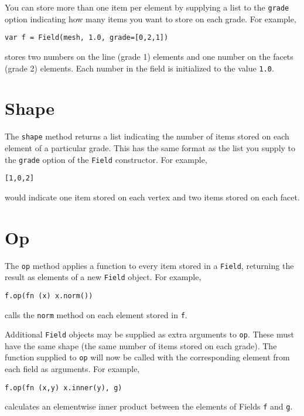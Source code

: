 You can store more than one item per element by supplying a list to the
\texttt{grade} option indicating how many items you want to store on
each grade. For example,

\begin{lstlisting}
var f = Field(mesh, 1.0, grade=[0,2,1])
\end{lstlisting}

stores two numbers on the line (grade 1) elements and one number on the
facets (grade 2) elements. Each number in the field is initialized to
the value \texttt{1.0}.

\hypertarget{shape}{%
\section{Shape}\label{shape}}

The \texttt{shape} method returns a list indicating the number of items
stored on each element of a particular grade. This has the same format
as the list you supply to the \texttt{grade} option of the
\texttt{Field} constructor. For example,

\begin{lstlisting}
[1,0,2]
\end{lstlisting}

would indicate one item stored on each vertex and two items stored on
each facet.

\hypertarget{op}{%
\section{Op}\label{op}}

The \texttt{op} method applies a function to every item stored in a
\texttt{Field}, returning the result as elements of a new \texttt{Field}
object. For example,

\begin{lstlisting}
f.op(fn (x) x.norm())
\end{lstlisting}

calls the \texttt{norm} method on each element stored in \texttt{f}.

Additional \texttt{Field} objects may be supplied as extra arguments to
\texttt{op}. These must have the same shape (the same number of items
stored on each grade). The function supplied to \texttt{op} will now be
called with the corresponding element from each field as arguments. For
example,

\begin{lstlisting}
f.op(fn (x,y) x.inner(y), g)
\end{lstlisting}

calculates an elementwise inner product between the elements of Fields
\texttt{f} and \texttt{g}.

